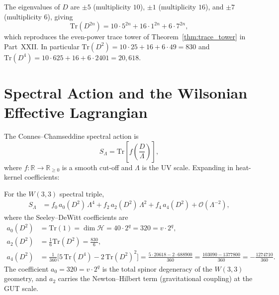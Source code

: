 \begin{theorem}
\label{thm:dirac_spec}
The eigenvalues of $D$ are $\pm 5$ (multiplicity $10$),
$\pm 1$ (multiplicity $16$), and $\pm 7$ (multiplicity $6$), giving
\begin{equation}
  \mathrm{Tr}(D^{2n}) = 10\cdot 5^{2n}+16\cdot 1^{2n}+6\cdot 7^{2n},
  \label{eq:even_trace}
\end{equation}
which reproduces the even-power trace tower of Theorem~\ref{thm:trace_tower}
in Part~XXII.  In particular $\mathrm{Tr}(D^2)=10\cdot25+16+6\cdot49=830$
and $\mathrm{Tr}(D^4)=10\cdot625+16+6\cdot2401=20,618$.
\end{theorem}

\section{Spectral Action and the Wilsonian Effective Lagrangian}
\label{sec:spectral_action}

The Connes--Chamseddine spectral action is
\begin{equation}
  S_\Lambda = \mathrm{Tr}\!\left[f\!\left(\frac{D}{\Lambda}\right)\right],
  \label{eq:spectral_action}
\end{equation}
where $f:\mathbb{R}\to\mathbb{R}_{\geq 0}$ is a smooth cut-off and
$\Lambda$ is the UV scale.  Expanding in heat-kernel coefficients:

\begin{theorem}
\label{thm:heat_kernel}
For the $W(3,3)$ spectral triple,
\begin{align}
  S_\Lambda &= f_0\,a_0(D^2)\,\Lambda^4
             + f_2\,a_2(D^2)\,\Lambda^2
             + f_4\,a_4(D^2)
             + \mathcal{O}(\Lambda^{-2}),
  \label{eq:heat_kernel_exp}
\end{align}
where the Seeley--DeWitt coefficients are
\begin{align}
  a_0(D^2) &= \mathrm{Tr}(1) = \dim\mathcal{H} = 40\cdot 2^q = 320
              = v\cdot 2^q,
  \label{eq:a0}\\
  a_2(D^2) &= \tfrac{1}{6}\mathrm{Tr}(D^2) = \tfrac{830}{6},
  \label{eq:a2}\\
  a_4(D^2) &= \tfrac{1}{360}\bigl[5\,\mathrm{Tr}(D^4)-2\,\mathrm{Tr}(D^2)^2\bigr]
             = \frac{5\cdot 20618 - 2\cdot 688900}{360}
             = \frac{103090-1377800}{360}
             = -\frac{1274710}{360}.
  \label{eq:a4}
\end{align}
The coefficient $a_0=320=v\cdot 2^q$ is the total spinor degeneracy of
the $W(3,3)$ geometry, and $a_2$ carries the Newton--Hilbert term
(gravitational coupling) at the GUT scale.
\end{theorem}

